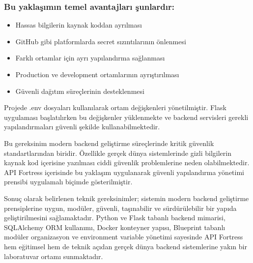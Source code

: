 \subsubsection{Bu yaklaşımın temel avantajları şunlardır:}

\begin{itemize}[leftmargin=*]
    \item Hassas bilgilerin kaynak koddan ayrılması
    \item GitHub gibi platformlarda secret sızıntılarının önlenmesi
    \item Farklı ortamlar için ayrı yapılandırma sağlanması
    \item Production ve development ortamlarının ayrıştırılması
    \item Güvenli dağıtım süreçlerinin desteklenmesi
\end{itemize}

Projede .env dosyaları kullanılarak ortam değişkenleri yönetilmiştir. Flask uygulaması başlatılırken bu değişkenler yüklenmekte ve backend servisleri gerekli yapılandırmaları güvenli şekilde kullanabilmektedir.

Bu gereksinim modern backend geliştirme süreçlerinde kritik güvenlik standartlarından biridir. Özellikle gerçek dünya sistemlerinde gizli bilgilerin kaynak kod içerisine yazılması ciddi güvenlik problemlerine neden olabilmektedir. API Fortress içerisinde bu yaklaşım uygulanarak güvenli yapılandırma yönetimi prensibi uygulamalı biçimde gösterilmiştir.

Sonuç olarak belirlenen teknik gereksinimler; sistemin modern backend geliştirme prensiplerine uygun, modüler, güvenli, taşınabilir ve sürdürülebilir bir yapıda geliştirilmesini sağlamaktadır. Python ve Flask tabanlı backend mimarisi, SQLAlchemy ORM kullanımı, Docker konteyner yapısı, Blueprint tabanlı modüler organizasyon ve environment variable yönetimi sayesinde API Fortress hem eğitimsel hem de teknik açıdan gerçek dünya backend sistemlerine yakın bir laboratuvar ortamı sunmaktadır.


\clearpage
